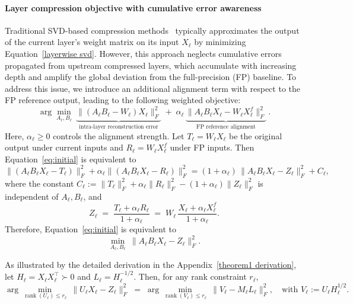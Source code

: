 \paragraph{Layer compression objective with cumulative error awareness}\label{sec:cealc}
Traditional SVD-based compression methods~\citep{li2025adasvd,Wang2024SVD-LLM} typically approximates the output of the current layer’s weight matrix on its input $X_\ell$ by minimizing Equation~\ref{layerwise svd}. However, this approach neglects cumulative errors propagated from upstream compressed layers, which accumulate with increasing depth and amplify the global deviation from the full-precision (FP) baseline. To address this issue, we introduce an additional alignment term with respect to the FP reference output, leading to the following weighted objective:
\begin{equation}
    \arg\min_{A_\ell,B_\ell}\ \underbrace{\|(A_\ell B_\ell - W_\ell)X_\ell\|_F^2}_{\text{intra-layer
reconstruction
error}} \;+\; \alpha_\ell\,\underbrace{\|A_\ell B_\ell X_\ell - W_\ell X_\ell^f\|_F^2}_{\text{FP reference alignment}}~.
\label{eq:initial}
\end{equation}
Here, $\alpha_\ell \geq 0$ controls the alignment strength. Let $T_\ell = W_\ell X_\ell$ be the original output under current inputs and $R_\ell = W_\ell X_\ell^f$ under FP inputs. Then Equation~\ref{eq:initial} is equivalent to
\begin{equation}
\|(A_\ell B_\ell X_\ell - T_\ell)\|_F^2 + \alpha_\ell \|(A_\ell B_\ell X_\ell - R_\ell)\|_F^2
=(1+\alpha_\ell)\,\|A_\ell B_\ell X_\ell - Z_\ell\|_F^2 + C_\ell,
\label{eq:complete-square}
\end{equation}
where the constant
\(C_\ell := \|T_\ell\|_F^2+\alpha_\ell\|R_\ell\|_F^2-(1+\alpha_\ell)\|Z_\ell\|_F^2\)
is independent of \(A_\ell,B_\ell\), and
\begin{equation}
{
Z_\ell \;=\; \frac{T_\ell+\alpha_\ell R_\ell}{1+\alpha_\ell}
\;=\;
W_\ell\,\frac{X_\ell+\alpha_\ell X_\ell^f}{1+\alpha_\ell}.
}
\label{eq:Z-def}
\end{equation}
Therefore, Equation~\ref{eq:initial} is equivalent to
\begin{equation}
\min_{A_\ell,B_\ell}\ \|A_\ell B_\ell X_\ell - Z_\ell\|_F^2.
\label{eq:reduced-objective}
\end{equation}

\begin{theorem}\label{theorem 1}
\label{thm:whiten}
As illustrated by the detailed derivation in the Appendix~\ref{theorem1 derivation}, let \(H_{\ell}=X_\ell X_\ell^\top\succ0\) and \(L_\ell=H_{\ell}^{-1/2}\).
Then, for any rank constraint $r_\ell$,
\begin{equation}
\arg\min_{\operatorname{rank}(U_\ell)\le r_\ell}\ \|U_\ell X_\ell - Z_\ell\|_F^2
\;=\;
\arg\min_{\operatorname{rank}(V_\ell)\le r_\ell}\ \big\|V_\ell - M_\ell L_\ell \big\|_F^2,
\quad
\text{with } V_\ell := U_\ell H_{\ell}^{1/2}.
\label{eq:whitened}
\end{equation}
\end{theorem}

